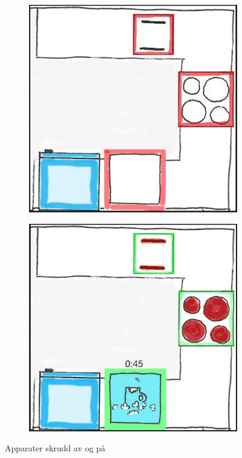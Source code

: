 \begin{figure}[ht]
\centering
\begin{subfigure}{0.32\textwidth}
\centering
\includegraphics[scale=0.1]{fig/kitchen}
\caption{}
\label{fig:kitchenon}
\end{subfigure}
\begin{subfigure}{0.32\textwidth}
\centering
\includegraphics[scale=0.1]{fig/kitchen2}
\caption{}
\label{fig:kitchenoff}
\end{subfigure}
\caption{Apparater skrudd av og på}
\label{fig:kitchenonoff}
\end{figure}
